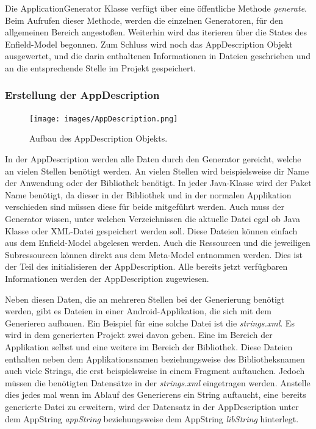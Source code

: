 Die ApplicationGenerator Klasse verfügt über eine öffentliche Methode \textit{generate}. Beim Aufrufen dieser Methode, werden die einzelnen Generatoren, für den allgemeinen Bereich angestoßen. Weiterhin wird das iterieren über die States des Enfield-Model begonnen. Zum Schluss wird noch das AppDescription Objekt ausgewertet, und die darin enthaltenen Informationen in Dateien geschrieben und an die entsprechende Stelle im Projekt gespeichert.

\subsubsection{Erstellung der AppDescription}

\begin{figure}[H]
	\begin{center}
		\texttt{[image: images/AppDescription.png]}
		\caption{Aufbau des AppDescription Objekts.}
		\label{fig:appDescription}
	\end{center}
\end{figure}

In der AppDescription werden alle Daten durch den Generator gereicht, welche an vielen Stellen benötigt werden. 
An vielen Stellen wird beispielsweise dir Name der Anwendung oder der Bibliothek benötigt. In jeder Java-Klasse wird der Paket Name benötigt, da dieser in der Bibliothek und in der normalen Applikation verschieden sind müssen diese für beide mitgeführt werden. Auch muss der Generator wissen, unter welchen Verzeichnissen die aktuelle Datei egal ob Java Klasse oder XML-Datei gespeichert werden soll. 
Diese Dateien können einfach aus dem Enfield-Model abgelesen werden. Auch die Ressourcen und die jeweiligen Subressourcen können direkt aus dem Meta-Model entnommen werden.  Dies ist der Teil des initialisieren der AppDescription. Alle bereits jetzt verfügbaren Informationen werden der AppDescription zugewiesen. 

Neben diesen Daten, die an mehreren Stellen bei der Generierung benötigt werden, gibt es Dateien in einer Android-Applikation, die sich mit dem Generieren aufbauen. Ein Beispiel für eine solche Datei ist die \textit{strings.xml}. 
Es wird in dem generierten Projekt zwei davon geben. Eine im Bereich der Applikation selbst und eine weitere im Bereich der Bibliothek. Diese Dateien enthalten neben dem Applikationsnamen beziehungsweise des Bibliotheksnamen auch viele Strings, die erst beispielsweise in einem Fragment auftauchen. Jedoch müssen die benötigten Datensätze in der \textit{strings.xml} eingetragen werden. Anstelle dies jedes mal wenn im Ablauf des Generierens ein String auftaucht, eine bereits generierte Datei zu erweitern, wird der Datensatz in der AppDescription unter dem AppString \textit{appString} beziehungsweise dem AppString \textit{libString} hinterlegt.

